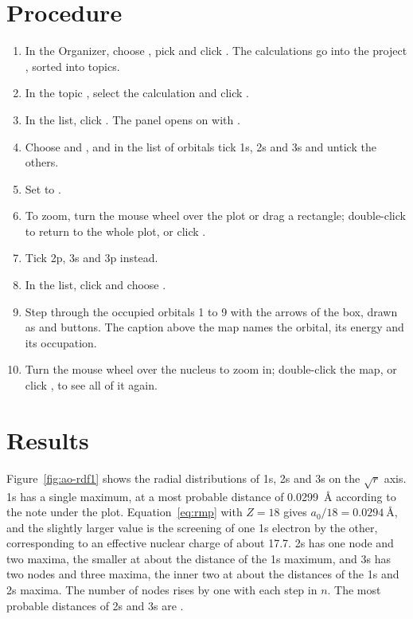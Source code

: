 \section{Procedure}
\begin{enumerate}
	\item In the Organizer, choose , pick  and click . The calculations go into the project , sorted into topics.
	\item In the topic , select the calculation  and click .
	\item In the  list, click . The panel opens on  with  .
	\item Choose  and , and in the list of orbitals tick 1s, 2s and 3s and untick the others.
	\item Set  to .
	\item To zoom, turn the mouse wheel over the plot or drag a rectangle; double-click to return to the whole plot, or click .
	\item Tick 2p, 3s and 3p instead.
	\item In the  list, click  and choose .
	\item Step through the occupied orbitals 1 to 9 with the arrows of the  box, drawn as \ctrl{$-$} and \ctrl{+} buttons. The caption above the map names the orbital, its energy and its occupation.
	\item Turn the mouse wheel over the nucleus to zoom in; double-click the map, or click , to see all of it again.
\end{enumerate}

\section{Results}
Figure~\ref{fig:ao-rdf1} shows the radial distributions of 1s, 2s and 3s on the $\sqrt{r}$ axis. 1s has a single maximum, at a most probable distance of \SI{0.0299}{\angstrom} according to the note under the plot. Equation~\eqref{eq:rmp} with $Z = 18$ gives $a_0/18 = \SI{0.0294}{\angstrom}$, and the slightly larger value is the screening of one 1s electron by the other, corresponding to an effective nuclear charge of about 17.7. 2s has one node and two maxima, the smaller at about the distance of the 1s maximum, and 3s has two nodes and three maxima, the inner two at about the distances of the 1s and 2s maxima. The number of nodes rises by one with each step in $n$. The most probable distances of 2s and 3s are .

